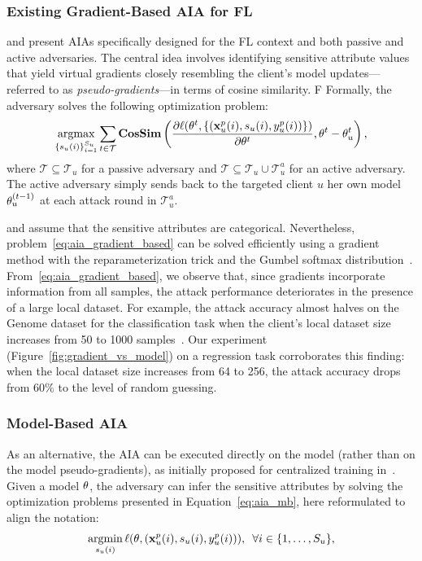 \subsubsection{Existing Gradient-Based AIA for FL}\label{subsec:gradient-based}
  and  present AIAs specifically designed for the FL context and both passive and active adversaries.
The central idea involves identifying sensitive attribute values that yield virtual gradients closely resembling the client's model updates---referred to as \emph{pseudo-gradients}---in terms of cosine similarity. F Formally, the adversary solves the following optimization problem:
 \begin{equation}\label{eq:aia_gradient_based}
  \operatorname*{argmax}_{\{s_u(i)\}_{i=1}^{S_u}} \sum_{t\in \mathcal{T}}\textbf{CosSim} \left(\frac{\partial\ell(\theta^t, 
    \{({\mathbf{x}}_u^p(i), s_u(i), y_u^p(i))\})}{\partial \theta^t}, \theta^t-\theta_u^t\right), 
\end{equation}
where $\mathcal{T}\subseteq \mathcal{T}_u$ for a passive adversary and  $\mathcal{T}\subseteq \mathcal{T}_u \cup \mathcal{T}_u^a$ for an active adversary. 
The active adversary simply sends back to the targeted client $u$ her own model $\theta_u^{(t-1)}$ at each attack round in $\mathcal{T}_u^a$.

 and  assume that the sensitive attributes are categorical. 
Nevertheless, problem~\eqref{eq:aia_gradient_based} can be solved efficiently using a gradient method with the reparameterization trick and the Gumbel softmax distribution~\cite{jang2017categorical}. 
From~\eqref{eq:aia_gradient_based}, we observe that, since gradients incorporate information from all samples, the attack performance deteriorates in the presence of a large local dataset.
For example, the attack accuracy almost halves on the Genome dataset for the classification task when the client's local dataset size increases from 50 to 1000 samples~\cite[Table~8]{lyu2021novelattributereconstructionattack}. Our experiment (Figure~\ref{fig:gradient_vs_model}) on a regression task corroborates this finding: when the local dataset size increases from 64 to 256, the attack accuracy drops from $60\%$ to the level of random guessing.

\subsubsection{Model-Based AIA} As an alternative, the AIA can be executed directly on the model (rather than on the model pseudo-gradients), as initially proposed for  centralized training in~\cite{kasiviswanathan2013power,aia_fredrikson}. Given a model $\theta$, the adversary can infer the sensitive attributes by solving the optimization problems presented in Equation~\ref{eq:aia_mb}, here reformulated to align the notation:
\begin{equation}\label{eq:aia_model_based}
     \operatorname*{argmin}_{s_u(i)} \ell(\theta,({\mathbf{x}}_u^p(i), s_u(i), y_u^p(i))),\,\,\, \forall i\in\{1,\dots,S_u\}, 
\end{equation}

